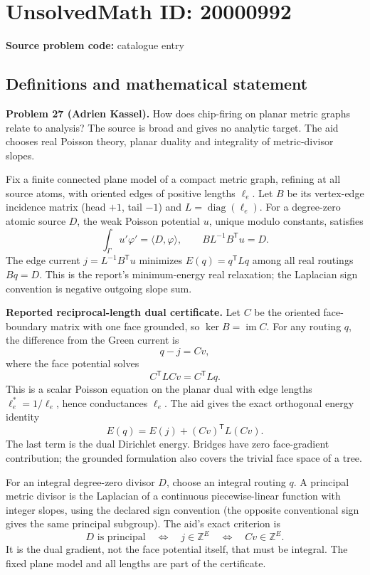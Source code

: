 \documentclass[11pt]{article}
\newcommand{\Z}{\mathbb{Z}}
\begin{document}
\section*{UnsolvedMath ID: 20000992}
\textbf{Source problem code:} catalogue entry
\subsection{Definitions and mathematical statement}
\textbf{Problem 27 (Adrien Kassel).} How does chip-firing on planar metric graphs relate to analysis? The source is broad and gives no analytic target. The aid chooses real Poisson theory, planar duality and integrality of metric-divisor slopes.

Fix a finite connected plane model of a compact metric graph, refining at all source atoms, with oriented edges of positive lengths $\ell_e$. Let $B$ be its vertex-edge incidence matrix (head $+1$, tail $-1$) and $L=\operatorname{diag}(\ell_e)$. For a degree-zero atomic source $D$, the weak Poisson potential $u$, unique modulo constants, satisfies
\[
 \int_\Gamma u'\varphi'=\langle D,\varphi\rangle,
 \qquad BL^{-1}B^{\mathsf T}u=D.
\]
The edge current $j=L^{-1}B^{\mathsf T}u$ minimizes $E(q)=q^{\mathsf T}Lq$ among all real routings $Bq=D$. This is the report's minimum-energy real relaxation; the Laplacian sign convention is negative outgoing slope sum.

\textbf{Reported reciprocal-length dual certificate.} Let $C$ be the oriented face-boundary matrix with one face grounded, so $\ker B=\operatorname{im}C$. For any routing $q$, the difference from the Green current is
\[
 q-j=Cv,
\]
where the face potential solves
\[
 C^{\mathsf T}LCv=C^{\mathsf T}Lq.
\]
This is a scalar Poisson equation on the planar dual with edge lengths $\ell_e^*=1/\ell_e$, hence conductances $\ell_e$. The aid gives the exact orthogonal energy identity
\[
 E(q)=E(j)+(Cv)^{\mathsf T}L(Cv).
\]
The last term is the dual Dirichlet energy. Bridges have zero face-gradient contribution; the grounded formulation also covers the trivial face space of a tree.

For an integral degree-zero divisor $D$, choose an integral routing $q$. A principal metric divisor is the Laplacian of a continuous piecewise-linear function with integer slopes, using the declared sign convention (the opposite conventional sign gives the same principal subgroup). The aid's exact criterion is
\[
 D\text{ is principal}\quad\Longleftrightarrow\quad j\in\Z^{E}
 \quad\Longleftrightarrow\quad Cv\in\Z^{E}.
\]
It is the dual gradient, not the face potential itself, that must be integral. The fixed plane model and all lengths are part of the certificate.
\end{document}
